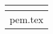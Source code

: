 \documentclass{report}
\def\tabularnewline{\\}
\begin{document}
\begin{table}[!tbp]
\begin{center}
\begin{tabular}{l}
\hline\hline
\multicolumn{1}{c}{}\tabularnewline
\hline
pem.tex\tabularnewline
\hline
\end{tabular}\end{center}
\end{table}
\end{document}
